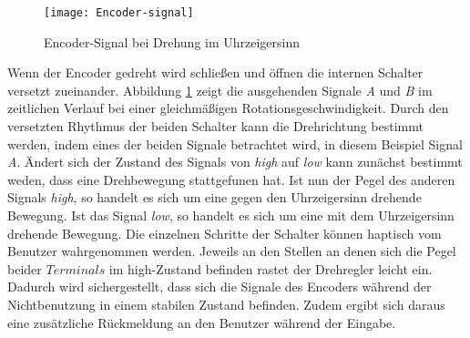 \begin{figure}[h]
	\texttt{[image: Encoder-signal]}
	\caption{Encoder-Signal bei Drehung im Uhrzeigersinn}
	\label{fig:Encoder-signal}
\end{figure}
Wenn der Encoder gedreht wird schließen und öffnen die internen Schalter versetzt zueinander. Abbildung \ref{fig:Encoder-signal} zeigt die ausgehenden Signale \textit{A} und \textit{B} im zeitlichen Verlauf bei einer gleichmäßigen Rotationsgeschwindigkeit. Durch den versetzten Rhythmus der beiden Schalter kann die Drehrichtung bestimmt werden, indem eines der beiden Signale betrachtet wird, in diesem Beispiel Signal \textit{A}. Ändert sich der Zustand des Signals von \textit{high} auf \textit{low} kann zunächst bestimmt weden, dass eine Drehbewegung stattgefunen hat. Ist nun der Pegel des anderen Signals \textit{high}, so handelt es sich um eine gegen den Uhrzeigersinn drehende Bewegung. Ist das Signal \textit{low}, so handelt es sich um eine mit dem Uhrzeigersinn drehende Bewegung. Die einzelnen Schritte der Schalter können haptisch vom Benutzer wahrgenommen werden. Jeweils an den Stellen an denen sich die Pegel beider $Terminals$ im high-Zustand befinden rastet der Drehregler leicht ein. Dadurch wird sichergestellt, dass sich die Signale des Encoders während der Nichtbenutzung in einem stabilen Zustand befinden. Zudem ergibt sich daraus eine zusätzliche Rückmeldung an den Benutzer während der Eingabe.\\
